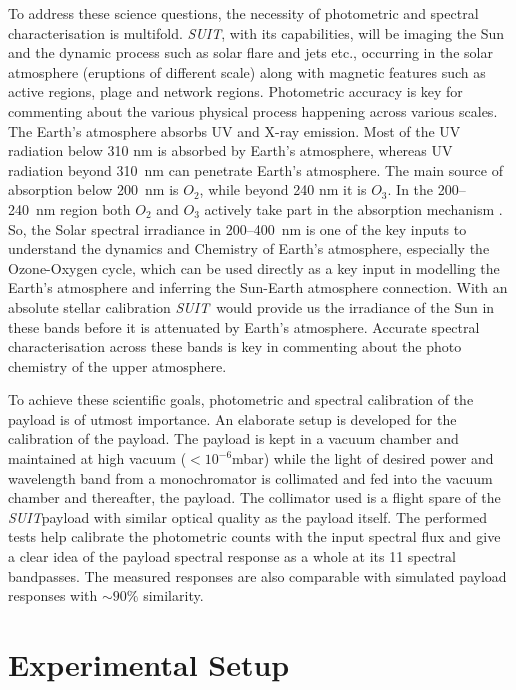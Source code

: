 \documentclass[12pt]{spieman}  %
\newcommand{\suit}{{\it{SUIT}}}
\begin{document}
To address these science questions, the necessity of photometric and spectral characterisation is multifold.  \suit, with its capabilities, will be imaging the Sun and the dynamic process such as solar flare and jets etc., occurring in the solar atmosphere (eruptions of different scale) along with magnetic features such as active regions, plage and network regions. Photometric accuracy is key for commenting about the various physical process happening across various scales. The Earth's atmosphere absorbs UV and X-ray emission. Most of the UV radiation below 310 nm is absorbed by Earth's atmosphere, whereas UV radiation beyond 310~nm can penetrate Earth's atmosphere. The main source of absorption below 200~nm is $O_{2}$, while beyond 240 nm it is $O_{3}$. In the 200{--}240~nm region both $O_{2}$ and $O_{3}$ actively take part in the absorption mechanism \cite{haigh07}. So, the Solar spectral irradiance in 200{--}400~nm is one of the key inputs to understand the dynamics and Chemistry of Earth's atmosphere, especially the Ozone-Oxygen cycle, which can be used directly as a key input in modelling the Earth's atmosphere and inferring the Sun-Earth atmosphere connection. With an absolute stellar calibration \suit~would provide us the irradiance of the Sun in these bands before it is attenuated by Earth's atmosphere. Accurate spectral characterisation across these bands is key in commenting about the photo chemistry of the upper atmosphere.

To achieve these scientific goals, photometric and spectral calibration of the payload is of utmost importance. An elaborate setup is developed for the calibration of the payload. The payload is kept in a vacuum chamber and maintained at high vacuum ($<10^{-6}$mbar) while the light of desired power and wavelength band from a monochromator is collimated and fed into the vacuum chamber and thereafter, the payload. The collimator used is a flight spare of the \suit payload with similar optical quality as the payload itself. The performed tests help calibrate the photometric counts with the input spectral flux and give a clear idea of the payload spectral response as a whole at its 11 spectral bandpasses. The measured responses are also comparable with simulated payload responses with $\sim 90\%$ similarity.

\section{Experimental Setup}\label{sec:setup}
\end{document}
